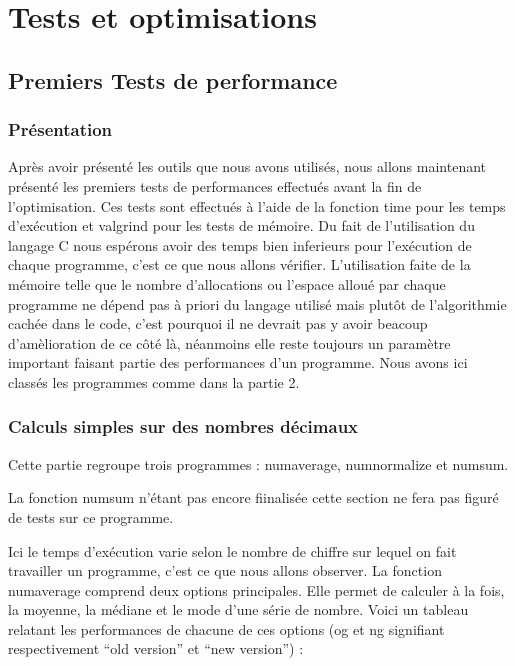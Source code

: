 
\chapter{Tests et optimisations}
\label{chap:tests et optimisations}

\section{Premiers Tests de performance}

\subsection{Présentation}

Après avoir présenté les outils que nous avons utilisés, nous allons maintenant présenté les premiers tests de performances effectués avant la fin de l'optimisation.
Ces tests sont effectués à l'aide de la fonction time pour les temps d'exécution et valgrind pour les tests de mémoire.
Du fait de l'utilisation du langage C nous espérons avoir des temps bien inferieurs pour l'exécution de chaque programme, c'est ce que nous allons vérifier.
L'utilisation faite de la mémoire telle que le nombre d'allocations ou l'espace alloué par chaque programme ne dépend pas à priori du langage utilisé mais plutôt de l'algorithmie cachée dans le code, c'est pourquoi il ne devrait pas y avoir beacoup d'amèlioration de ce côté là,
néanmoins elle reste toujours un paramètre important faisant partie des performances d'un programme.
Nous avons ici classés les programmes comme dans la partie 2.

\subsection{Calculs simples sur des nombres d\'ecimaux}

Cette partie regroupe trois programmes : numaverage, numnormalize et numsum.
\newline

La fonction numsum n'étant pas encore fiinalisée cette section ne fera pas figuré de tests sur ce programme.
\newline

Ici le temps d'exécution varie selon le nombre de chiffre sur lequel on fait travailler un programme, c'est ce que nous allons observer.
La fonction numaverage comprend deux options principales. Elle permet de calculer à la fois, la moyenne, la médiane et le mode d'une série de nombre.
Voici un tableau relatant les performances de chacune de ces options (og et ng signifiant respectivement ``old version'' et ``new version'') : 
\newline


